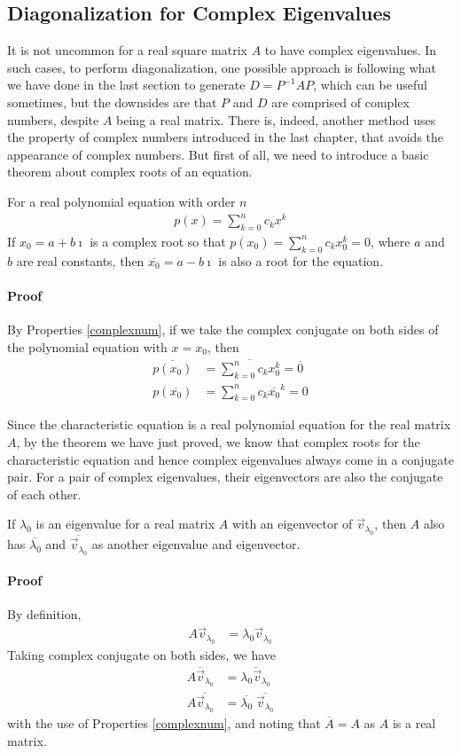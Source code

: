 \subsection{Diagonalization for Complex Eigenvalues}
It is not uncommon for a real square matrix $A$ to have complex eigenvalues. In such cases, to perform diagonalization, one possible approach is following what we have done in the last section to generate $D = P^{-1}AP$, which can be useful sometimes, but the downsides are that $P$ and $D$ are comprised of complex numbers, despite $A$ being a real matrix. There is, indeed, another method uses the property of complex numbers introduced in the last chapter, that avoids the appearance of complex numbers. But first of all, we need to introduce a basic theorem about complex roots of an equation.
\begin{thm}
For a real polynomial equation with order $n$
\begin{align*}
p(x) = \sum_{k=0}^{n} c_k x^k
\end{align*}
If $x_0 = a+b\imath$ is a complex root so that $p(x_0) = \sum_{k=0}^{n} c_k x_0^k = 0$, where $a$ and $b$ are real constants, then
$\overline{x_0} = a-b\imath$ is also a root for the equation.
\paragraph{Proof}
By Properties \ref{complexnum}, if we take the complex conjugate on both sides of the polynomial equation with $x = x_0$, then
\begin{align*}
\overline{p(x_0)} &= \overline{\sum_{k=0}^{n} c_k x_0^k} = \overline{0} \\
{p(\overline{x_0})} &= \sum_{k=0}^{n} c_k \overline{x_0}^k = 0
\end{align*}
\end{thm}
Since the characteristic equation is a real polynomial equation for the real matrix $A$, by the theorem we have just proved, we know that complex roots for the characteristic equation and hence complex eigenvalues always come in a conjugate pair. For a pair of complex eigenvalues, their eigenvectors are also the conjugate of each other.
\begin{proper}
If $\lambda_0$ is an eigenvalue for a real matrix $A$ with an eigenvector of $\vec{v}_{\lambda_0}$, then $A$ also has $\overline{\lambda_0}$ and $\overline{\vec{v}_{\lambda_0}}$ as another eigenvalue and eigenvector.
\paragraph{Proof}
By definition,
\begin{align*}
A\vec{v}_{\lambda_0} &= \lambda_0\vec{v}_{\lambda_0}    
\end{align*}
Taking complex conjugate on both sides, we have
\begin{align*}
\overline{A\vec{v}_{\lambda_0}} &= \overline{\lambda_0\vec{v}_{\lambda_0}} \\
A \overline{\vec{v}_{\lambda_0}} &= \overline{\lambda_0}\; \overline{\vec{v}_{\lambda_0}}
\end{align*}
with the use of Properties \ref{complexnum}, and noting that $\overline{A} = A$ as $A$ is a real matrix.
\end{proper}
